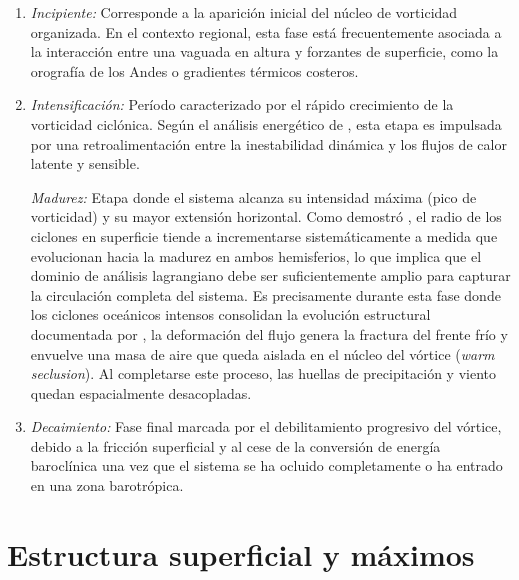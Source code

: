 \begin{enumerate}
    \item \textit{Incipiente:} Corresponde a la aparición inicial del núcleo de vorticidad organizada. 
    En el contexto regional, esta fase está frecuentemente asociada a la interacción entre una vaguada en altura y forzantes de superficie, como la orografía de los Andes o gradientes térmicos costeros.

    \item \textit{Intensificación:} Período caracterizado por el rápido crecimiento de la vorticidad ciclónica. 
    Según el análisis energético de \citet{coutodesouza2024thesis}, esta etapa es impulsada por una retroalimentación entre la inestabilidad dinámica y los flujos de calor latente y sensible.

    \textit{Madurez:} Etapa donde el sistema alcanza su intensidad máxima (pico de vorticidad) y su mayor extensión horizontal. Como demostró \citet{simmonds2000size}, el radio de los ciclones en superficie tiende a incrementarse sistemáticamente a medida que evolucionan hacia la madurez en ambos hemisferios, lo que implica que el dominio de análisis lagrangiano debe ser suficientemente amplio para capturar la circulación completa del sistema. 
    Es precisamente durante esta fase donde los ciclones oceánicos intensos consolidan la evolución estructural documentada por \citet{shapiro1999bridge}, la deformación del flujo genera la fractura del frente frío y envuelve una masa de aire que queda aislada en el núcleo del vórtice (\textit{warm seclusion}). 
    Al completarse este proceso, las huellas de precipitación y viento quedan espacialmente desacopladas.

    \item \textit{Decaimiento:} Fase final marcada por el debilitamiento progresivo del vórtice, debido a la fricción superficial y al cese de la conversión de energía baroclínica una vez que el sistema se ha ocluido completamente o ha entrado en una zona barotrópica.
\end{enumerate}


\section{Estructura superficial y máximos}\label{sec:tb_compuestos}

